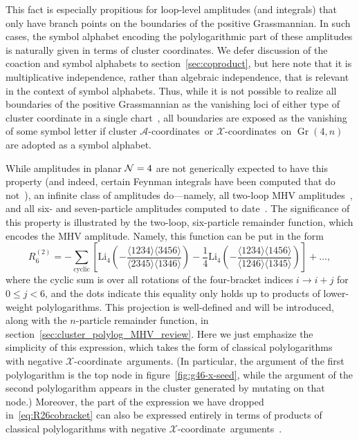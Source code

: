 \documentclass[12pt]{article}
\DeclareMathOperator{\Gr}{Gr}
\def\xcoord{$\mathcal{X}$-coordinate}
\def\xcoords{$\mathcal{X}$-coordinates}
\def\acoords{$\mathcal{A}$-coordinates}
\begin{document}
This fact is especially propitious for loop-level amplitudes (and integrals) that only have branch points on the boundaries of the positive Grassmannian. In such cases, the symbol alphabet encoding the polylogarithmic part of these amplitudes is naturally given in terms of cluster coordinates. We defer discussion of the coaction and symbol alphabets to section~\ref{sec:coproduct}, but here note that it is multiplicative independence, rather than algebraic independence, that is relevant in the context of symbol alphabets. Thus, while it is not possible to realize all boundaries of the positive Grassmannian as the vanishing loci of either type of cluster coordinate in a single chart~\cite{ArkaniHamed:2012nw}, all boundaries are exposed as the vanishing of some symbol letter if cluster \acoords\ or \xcoords\ on $\Gr(4,n)$ are adopted as a symbol alphabet.

While amplitudes in planar ${\cal N}=4$ are not generically expected to have this property (and indeed, certain Feynman integrals have been computed that do not~\cite{Bourjaily:2018aeq,Henn:2018cdp}), an infinite class of amplitudes do---namely, all two-loop MHV amplitudes~\cite{CaronHuot:2011ky}, and all six- and seven-particle amplitudes computed to date~\cite{CaronHuot:2011kk,Dixon:2014iba,Drummond:2014ffa,Dixon:2015iva,Caron-Huot:2016owq,Dixon:2016nkn}. The significance of this property is illustrated by the two-loop, six-particle remainder function, which encodes the MHV amplitude. Namely, this function can be put in the form
\begin{equation} \label{eq:R26cobracket}
	R^{(2)}_6 = -\sum_{\text{cyclic}} \left[ \text{Li}_4\left(-\frac{\langle 1234 \rangle \langle 3456 \rangle}{\langle 2345 \rangle \langle 1346 \rangle}\right) - \frac{1}{4} \text{Li}_4 \left(-\frac{\langle 1234 \rangle \langle 1456 \rangle}{\langle 1246 \rangle \langle 1345 \rangle}\right) \right] + \dots,
\end{equation}
where the cyclic sum is over all rotations of the four-bracket indices $i \rightarrow i+j$ for $0\leq j <6$, and the dots indicate this equality only holds up to products of lower-weight polylogarithms. This projection is well-defined and will be introduced, along with the $n$-particle remainder function, in section~\ref{sec:cluster_polylog_MHV_review}. Here we just emphasize the simplicity of this expression, which takes the form of classical polylogarithms with negative \xcoord\ arguments. (In particular, the argument of the first polylogarithm is the top node in figure~\ref{fig:g46-x-seed}, while the argument of the second polylogarithm appears in the cluster generated by mutating on that node.) Moreover, the part of the expression we have dropped in~\eqref{eq:R26cobracket} can also be expressed entirely in terms of products of classical polylogarithms with negative \xcoord\ arguments~\cite{Golden:2014xqf}. 
\end{document}
